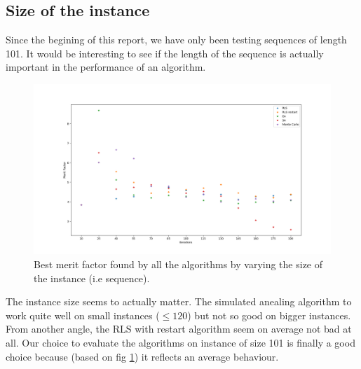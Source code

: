\documentclass[a4paper,11pt,openany]{article}
\begin{document}
\subsection{Size of the instance}
Since the begining of this report, we have only been testing sequences of length 101. It would be interesting to see if the length of the sequence is actually important in the performance of an algorithm.
\begin{figure}[H]
\begin{center}
\includegraphics[scale=0.26]{Images/instance_size}
\caption{Best merit factor found by all the algorithms by varying the size of the instance (i.e sequence).}
\label{fig:instance_size}
\end{center}
\end{figure}
\noindent
The instance size seems to actually matter. The simulated anealing algorithm to work quite well on small instances ($\leq 120$) but not so good on bigger instances.  From another angle, the RLS with restart algorithm seem on average not bad at all. Our choice to evaluate the algorithms on instance of size 101 is finally a good choice because (based on fig \ref{fig:instance_size}) it reflects an average behaviour.
\end{document}
